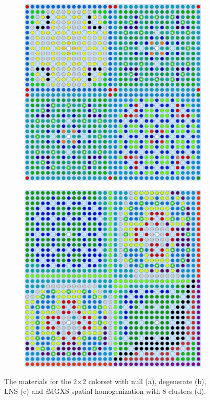 \documentclass[12pt,twoside]{mitthesis-exec}
\begin{document}
\begin{figure}[h!]
\begin{subfigure}{0.47\textwidth}
  \caption{}
  \label{fig:reflector-degenerate}
\end{subfigure}
\begin{subfigure}{0.47\textwidth}
  \centering
  \includegraphics[width=0.95\linewidth]{figures/patterns/lns/reflector/materials}
  \caption{}
  \label{fig:reflector-lns}
\end{subfigure}%
\begin{subfigure}{0.47\textwidth}
  \centering
  \includegraphics[width=0.95\linewidth]{figures/unsupervised/geometries/with-features/8-clusters/combined/reflector}
  \caption{}
  \label{fig:reflector-8-clusters}
\end{subfigure}
\caption[Materials for the 2$\times$2 colorset]{The materials for the 2$\times$2 colorset with null (a), degenerate (b), LNS (c) and \textit{i}MGXS spatial homogenization with 8 clusters (d).}
\label{fig:colorset-geometries}
\end{figure}
\end{document}

